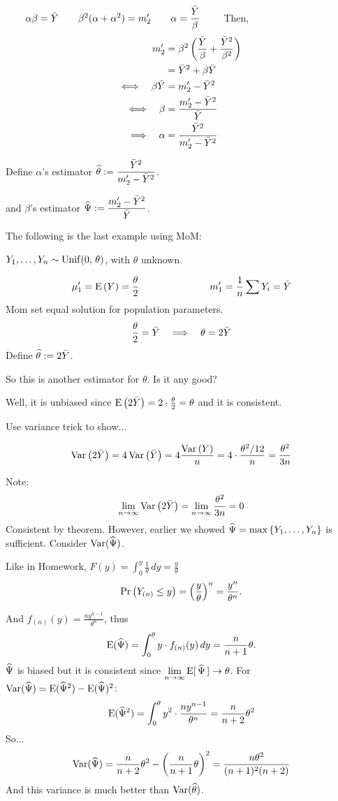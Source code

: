 \nl {} $\qquad \alpha\beta = \bar{Y} \qquad  \beta^2(\alpha + \alpha^2) = m_2' \qquad \alpha = \dfrac{\bar{Y}}{\beta} \qquad$ Then,
\begin{align}
m_2' &= \beta^2 \pars{\frac{\Ybar}{\beta} + \frac{\Ybar^2}{\beta^2}}\notag\\
&= \Ybar^2 + \beta \Ybar \notag\\
\Longleftrightarrow \quad \beta\Ybar &= m_2' - \Ybar^2 \notag\\
\Longleftrightarrow \quad \beta &= \frac{m_2' -\Ybar^2}{\Ybar}\notag\\
\Longrightarrow \quad \alpha &= \frac{\Ybar^2}{m_2'-\Ybar^2}\notag
\end{align}

\nl Define $\alpha$'s estimator $\displaystyle \widehat{\theta} :=  \frac{\bar{Y}^2}{m_2'-\bar{Y}^2}$.

\nl and $\beta$'s estimator $\widehat{\Psi} := \dfrac{m_2' -\bar{Y}^2}{\bar{Y}}$.

\nnl The following is the last example using MoM:

\example* ${Y}_1, \dots, {Y}_n \sim \operatorname{Unif}(0,\,\theta)$, with $\theta$ unknown.

$$\mu_1' = \E{Y} = \frac{\theta}{2} \hspace{1in} m_1' = \over{n} \sum Y_i = \Ybar$$
Mom set equal solution for population parameters.
$$\frac{\theta}{2} = \bar{Y} \quad \Longrightarrow \quad \theta = 2\bar{Y}$$
Define $\widehat{\theta} := 2\bar{Y}$.

\nl So this is another estimator for $\theta$. Is it any good?

\nl Well, it is unbiased since $\E{2\Ybar} = 2\cdot\frac{\theta}{2} = \theta$ and it is consistent.

\nl Use variance trick to show$\dots$

$$\Var{2\Ybar} = 4\Var{\Ybar} = 4 \frac{\Var{Y}}{n} = 4 \cdot \frac{\theta^2 / 12}{n} = \frac{\theta^2}{3n}$$

\nl Note:
$$\limn \Var{2\Ybar} = \limn \frac{\theta^2}{3n} = 0$$
Consistent by theorem. However, earlier we showed $\widehat{\Psi} = \operatorname{max}\left\{ {Y}_1, \dots, {Y}_n \right\}$ is sufficient. Consider $\Var*{\Psihat}$.

\nl Like in Homework, $\displaystyle F(y) = \int_0^y \frac{1}{\theta}\,dy = \frac{y}{\theta}$
$$\P{Y_{(n)} \leq y} = \pars{\frac{y}{\theta}}^n = \frac{y^n}{\theta^n}.$$

\nl And $\displaystyle f_{(n)}(y) = \frac{ny^{n-1}}{\theta^n}$, thus
$$\E*{\Psihat} = \int_0^{\theta} y \cdot f_{(n)}(y)\,dy = \frac{n}{n+1}\theta.$$
$\widehat{\Psi}$ is biased but it is consistent since $\displaystyle \lim_{n\to\infty} \operatorname{E}[\,\widehat{\Psi}\,] \to \theta$. For $\Var*{\Psihat} = \E*{\Psihat^2} - \E*{\Psihat}^2$:
$$\E*{\Psihat^2} = \int_0^{\theta} y^2 \cdot \frac{ny^{n-1}}{\theta^n} = \frac{n}{n+2}\theta^2$$
So...
$$\Var*{\Psihat} =  \frac{n}{n+2}\theta^2 - \pars{\frac{n}{n+1}\theta}^2 = \frac{n\theta^2}{(n+1)^2(n+2)}$$
And this variance is much better than $\Var*{\that}$.


